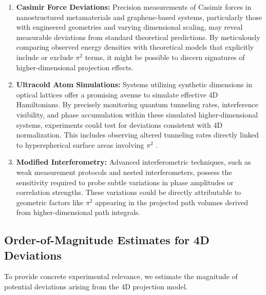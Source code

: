 \documentclass[12pt,a4paper]{article}
\begin{document}
\begin{enumerate}
    \item \textbf{Casimir Force Deviations:} Precision measurements of Casimir forces in nanostructured metamaterials and graphene-based systems, particularly those with engineered geometries and varying dimensional scaling, may reveal measurable deviations from standard theoretical predictions. By meticulously comparing observed energy densities with theoretical models that explicitly include or exclude \(\pi^2\) terms, it might be possible to discern signatures of higher-dimensional projection effects.

    \item \textbf{Ultracold Atom Simulations:} Systems utilizing synthetic dimensions in optical lattices offer a promising avenue to simulate effective 4D Hamiltonians. By precisely monitoring quantum tunneling rates, interference visibility, and phase accumulation within these simulated higher-dimensional systems, experiments could test for deviations consistent with 4D normalization. This includes observing altered tunneling rates directly linked to hyperspherical surface areas involving \(\pi^2\) \cite{lohse_exploring_2018, ozawa_topological_2019}.

    \item \textbf{Modified Interferometry:} Advanced interferometric techniques, such as weak measurement protocols and nested interferometers, possess the sensitivity required to probe subtle variations in phase amplitudes or correlation strengths. These variations could be directly attributable to geometric factors like \(\pi^2\) appearing in the projected path volumes derived from higher-dimensional path integrals.
\end{enumerate}

\subsection{Order-of-Magnitude Estimates for 4D Deviations}

To provide concrete experimental relevance, we estimate the magnitude of potential deviations arising from the 4D projection model. 
\end{document}
